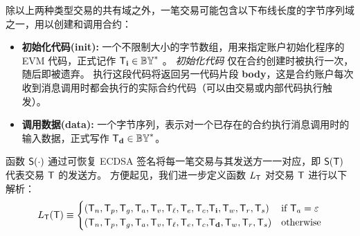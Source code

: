 \smallskip
除以上两种类型交易的共有域之外，一笔交易可能包含以下布线长度的字节序列域之一，用以创建和调用合约：
\begin{itemize}[nosep]
 	\item {\bf 初始化代码(init):} 
 	一个不限制大小的字节数组，用来指定账户初始化程序的 EVM 代码，正式记作 $\textsf{T}_{\bf i} \in \mathbb{BY}^*$ 。
 	\emph{初始化代码} 仅在合约创建时被执行一次，随后即被遗弃。
 	执行这段代码将返回另一代码片段 {\bf body}，这是合约账户每次收到消息调用时都会执行的实际合约代码（可以由交易或内部代码执行触发）。 


 	\item {\bf 调用数据(data):} 一个字节序列，表示对一个已存在的合约执行消息调用时的输入数据，正式写作 $\textsf{T}_{\bf d}\in \mathbb{BY}^*$。

 \end{itemize} 

函数 $\mathsf{S}{\left({\cdot} \right)}$ 通过可恢复 ECDSA 签名将每一笔交易与其发送方一一对应，即 $\mathsf{S}{\left({\textsf{T}} \right)}$ 代表交易 $\textsf{T}$ 的发送方。
%
方便起见，我们进一步定义函数 $L_{\textsf{T}}$ 对交易 $\textsf{T}$ 进行以下解析：
\begin{align}\label{def:tx_prepare}
	L_{\textsf{T}}(\textsf{T})\equiv 
	\begin{cases}
	\left(\textsf{T}_n, \textsf{T}_p, \textsf{T}_g, \textsf{T}_a, \textsf{T}_v, {\textsf{T}_\ell,\textsf{T}_e,\textsf{T}_c,} \textsf{T}_{\bf i}, \textsf{T}_w,\textsf{T}_r,\textsf{T}_s \right) & \mbox{if $\textsf{T}_a=\mathbb{\varepsilon}$} \\
	\left(\textsf{T}_n, \textsf{T}_p, \textsf{T}_g, \textsf{T}_a, \textsf{T}_v, {\textsf{T}_\ell,\textsf{T}_e,\textsf{T}_c,} \textsf{T}_{\bf d}, \textsf{T}_w,\textsf{T}_r,\textsf{T}_s \right) & \mbox{otherwise}
	\end{cases}
\end{align}


